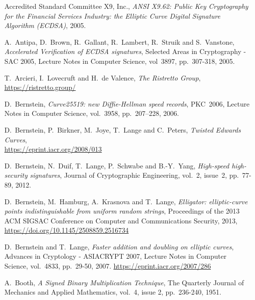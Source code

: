 \documentclass{llncs}
\begin{document}
\newpage
\begin{thebibliography}{20}

\RaggedRight

Accredited Standard Committee X9, Inc.,
\emph{ANSI X9.62: Public Key Cryptography for the Financial Services
Industry: the Elliptic Curve Digital Signature Algorithm (ECDSA)},
2005.

A.~Antipa, D.~Brown, R.~Gallant, R.~Lambert, R.~Struik and S.~Vanstone,
\emph{Accelerated Verification of ECDSA signatures},
Selected Areas in Cryptography - SAC 2005, Lecture Notes in Computer
Science, vol~3897, pp.~307-318, 2005.

T.~Arcieri, I.~Lovecruft and H.~de Valence,
\emph{The Ristretto Group},\\
\url{https://ristretto.group/}

D.~Bernstein,
\emph{Curve25519: new Diffie-Hellman speed records},
PKC~2006, Lecture Notes in Computer Science, vol.~3958, pp.~207--228,
2006.

D.~Bernstein, P.~Birkner, M.~Joye, T.~Lange and C.~Peters,
\emph{Twisted Edwards Curves},\\
\url{https://eprint.iacr.org/2008/013}

D.~Bernstein, N.~Duif, T.~Lange, P.~Schwabe and B.-Y.~Yang,
\emph{High-speed high-security signatures},
Journal of Cryptographic Engineering, vol.~2, issue~2, pp.~77-89, 2012.

D.~Bernstein, M.~Hamburg, A.~Krasnova and T.~Lange,
\emph{Elligator: elliptic-curve points indistinguishable from uniform
random strings},
Proceedings of the 2013 ACM SIGSAC Conference on Computer and Communications
Security, 2013,\\
\url{https://doi.org/10.1145/2508859.2516734}

D.~Bernstein and T.~Lange,
\emph{Faster addition and doubling on elliptic curves},
Advances in Cryptology - ASIACRYPT 2007, Lecture Notes in Computer
Science, vol.~4833, pp.~29-50, 2007.
\url{https://eprint.iacr.org/2007/286}

A.~Booth,
\emph{A Signed Binary Multiplication Technique},
The Quarterly Journal of Mechanics and Applied Mathematics,
vol.~4, issue 2, pp.~236-240, 1951.


\end{thebibliography}
\end{document}
